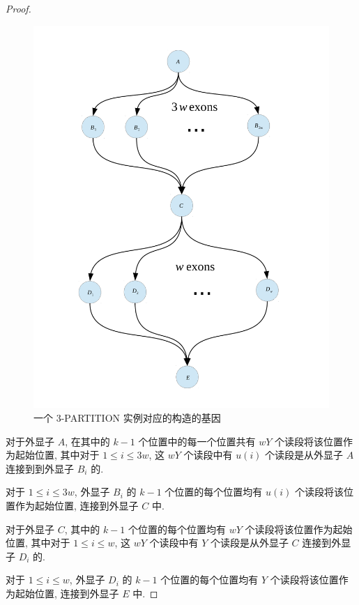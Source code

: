 \begin{proof}
\begin{figure}[!t]
\centering
\includegraphics[width=1.05\textwidth]{figures/nphard/part3-gene.pdf}
\caption{一个 3-PARTITION 实例对应的构造的基因}
\label{tripart-reduce-gene}
\end{figure}

对于外显子 $A$, 在其中的 $k-1$ 个位置中的每一个位置共有 $wY$ 个读段将该位置作为起始位置, 
其中对于 $1\leq i\leq 3w$, 
这 $wY$ 个读段中有 $u(i)$ 个读段是从外显子 $A$ 连接到到外显子 $B_i$ 的. 

对于 $1\leq i\leq 3w$, 
外显子 $B_i$ 的 $k-1$ 个位置的每个位置均有 $u(i)$ 个读段将该位置作为起始位置, 
连接到外显子 $C$ 中. 

对于外显子 $C$, 其中的 $k-1$ 个位置的每个位置均有 $wY$ 个读段将该位置作为起始位置, 
其中对于 $1\leq i \leq w$,
这 $wY$ 个读段中有 $Y$ 个读段是从外显子 $C$ 连接到外显子 $D_i$ 的. 

对于 $1\leq i \leq w$,
外显子 $D_i$ 的 $k-1$ 个位置的每个位置均有 $Y$ 个读段将该位置作为起始位置, 
连接到外显子 $E$ 中. 


\end{proof}
